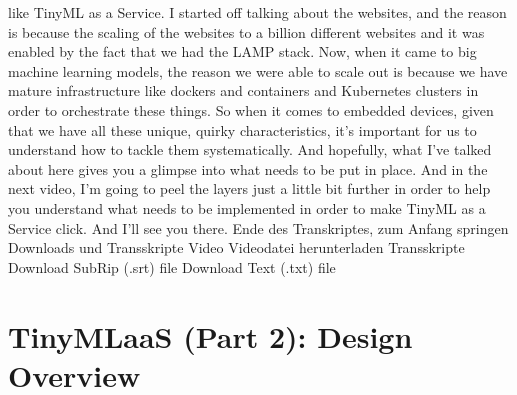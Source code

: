 {{{{{    like TinyML as a Service.
    I started off talking about the websites,
    and the reason is because the scaling of the websites
    to a billion different websites and it was enabled by the fact
    that we had the LAMP stack.
    Now, when it came to big machine learning models,
    the reason we were able to scale out is because we
    have mature infrastructure like dockers and containers
    and Kubernetes clusters in order to orchestrate these things.
    So when it comes to embedded devices, given
    that we have all these unique, quirky characteristics, it's important for us
    to understand how to tackle them systematically.
    And hopefully, what I've talked about here
    gives you a glimpse into what needs to be put in place.
    And in the next video, I'm going to peel the layers just a little bit further
    in order to help you understand what needs
    to be implemented in order to make TinyML as a Service click.
    And I'll see you there.
    Ende des Transkriptes, zum Anfang springen
    Downloads und Transskripte
    Video
    Videodatei herunterladen
    Transskripte
    Download SubRip (.srt) file
    Download Text (.txt) file

\section{TinyMLaaS (Part 2): Design Overview}

}}}}}
